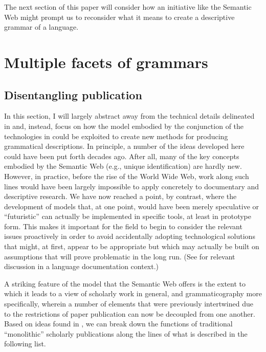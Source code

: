 The next section of this paper will consider how an initiative like the Semantic
Web might prompt us to reconsider what it means to create a descriptive grammar
of a language.




\section{Multiple facets of grammars\label{Facets}}

\subsection{Disentangling publication\label{Disentangling}}

In this section, I will largely abstract away from the technical details
delineated in  and, instead, focus on how the model embodied by
the conjunction of the technologies in  could be exploited to
create new methods for producing grammatical descriptions. In principle, a
number of the ideas developed here could have been put forth decades ago. After
all, many of the key concepts embodied by the Semantic Web (e.g., unique
identification) are hardly new. However, in practice, before the rise of the
World Wide Web, work along such lines would have been largely impossible to
apply concretely to documentary and descriptive research. We have now reached a
point, by contrast, where the development of models that, at one point, would
have been merely speculative or ``futuristic'' can actually be implemented in
specific tools, at least in prototype form. This makes it important for the
field to begin to consider the relevant issues proactively in order to avoid
accidentally adopting technological solutions that might, at first, appear to be
appropriate but which may actually be built on assumptions that will prove
problematic in the long run. (See  for
relevant discussion in a language documentation context.)

A striking feature of the model that the Semantic Web
offers is the extent to which it leads to a view of scholarly work in
general, and grammaticography more specifically, wherein a number of elements
that were previously intertwined due to the restrictions of paper
publication can now be decoupled from one another. Based on ideas found in
, we can break down the functions of traditional
``monolithic'' scholarly publications along the lines of what is described
in the following list.


